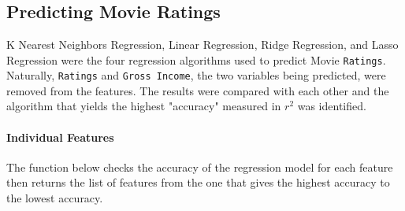 \documentclass[11pt]{article}
\begin{document}
    \begin{center}
    \end{center}
    { \hspace*{\fill} \\}
    
    \begin{center}
    \end{center}
    { \hspace*{\fill} \\}
    
    \begin{center}
    \end{center}
    { \hspace*{\fill} \\}
    
    \subsection{Predicting Movie Ratings}\label{predicting-movie-ratings}

    K Nearest Neighbors Regression, Linear Regression, Ridge Regression, and
Lasso Regression were the four regression algorithms used to predict
Movie \texttt{Ratings}. Naturally, \texttt{Ratings} and
\texttt{Gross\ Income}, the two variables being predicted, were removed
from the features. The results were compared with each other and the
algorithm that yields the highest "accuracy" measured in \(r^2\) was
identified.

    \paragraph{Individual Features}\label{individual-features}

    The function below checks the accuracy of the regression model for each
feature then returns the list of features from the one that gives the
highest accuracy to the lowest accuracy.
\end{document}
